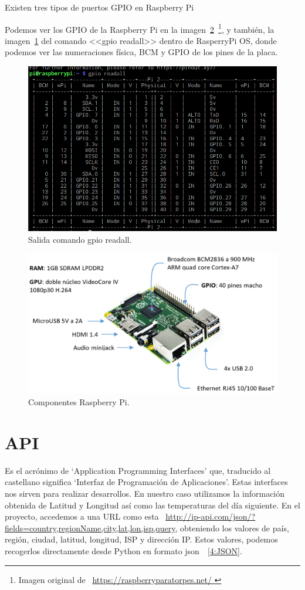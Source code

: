 Existen tres tipos de puertos GPIO en Raspberry Pi

Podemos ver los GPIO de la Raspberry Pi en la imagen~\ref{Img:3.RaspberryPi}~\footnote{Imagen original de ~\url{https://raspberryparatorpes.net/ }}, y también, la imagen~\ref{Img:3.GPIOReadAll} del comando <<gpio readall>> dentro de RasperryPi OS, donde podemos ver las numeraciones física, BCM y GPIO de los pines de la placa.

\begin{figure}
    \centering
    \includegraphics[width=.9\textwidth]{img/fotos/gpioReadall.png}
    \caption[Salida comando gpio readall]{Salida comando gpio readall.} \label{Img:3.GPIOReadAll}
\end{figure}

\begin{figure}
    \centering
    \includegraphics[width=.9\textwidth]{img/RBP2B.pdf}
    \caption[Componentes Raspberry Pi]{Componentes Raspberry Pi.} \label{Img:3.RaspberryPi}
\end{figure}

\section{API}\label{concepto:API}
Es el acrónimo de ‘Application Programming Interfaces’ que, traducido al castellano significa ‘Interfaz de Programación de Aplicaciones’. Estas interfaces nos sirven para realizar desarrollos. En nuestro caso utilizamos la información obtenida de Latitud y Longitud así como las temperaturas del día siguiente.
En el proyecto, accedemos a una URL como esta ~\url{http://ip-api.com/json/?fields=country,regionName,city,lat,lon,isp,query}, obteniendo los valores de país, región, ciudad, latitud, longitud, ISP y dirección IP.
Estos valores, podemos recogerlos directamente desde Python en formato json~\cite{misc:Json}~\ref{4:JSON}.

